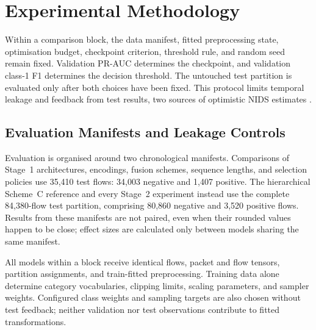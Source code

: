 \documentclass[11pt,fleqn]{report}
\begin{document}
\providecommand{\ExpPlatform}{Google Colaboratory Pro+}
\providecommand{\ExpComputeBudget}{600 purchased compute units}
\providecommand{\ExpGPU}{NVIDIA L4 (24~GB)}
\providecommand{\ExpCPU}{Google Colab hosted CPU; exact model not retained in the run metadata}
\providecommand{\ExpOS}{Google Colab hosted Linux runtime}
\providecommand{\ExpSoftware}{PyTorch and scikit-learn on CUDA; exact version snapshot not retained}
\providecommand{\ExpSuricata}{Suricata with the custom output module; exact version and revision not retained}

\chapter{Experimental Methodology}
\label{sec:experimental_methodology}

Within a comparison block, the data manifest, fitted preprocessing state, optimisation budget, checkpoint criterion, threshold rule, and random seed remain fixed. Validation PR-AUC determines the checkpoint, and validation class-1 F1 determines the decision threshold. The untouched test partition is evaluated only after both choices have been fixed. This protocol limits temporal leakage and feedback from test results, two sources of optimistic NIDS estimates \cite{SommerPaxson2010,Arp2022DosDonts}.

\section{Evaluation Manifests and Leakage Controls}
\label{subsec:experimental_data_protocol}

Evaluation is organised around two chronological manifests. Comparisons of Stage~1 architectures, encodings, fusion schemes, sequence lengths, and selection policies use 35,410 test flows: 34,003 negative and 1,407 positive. The hierarchical Scheme~C reference and every Stage~2 experiment instead use the complete 84,380-flow test partition, comprising 80,860 negative and 3,520 positive flows. Results from these manifests are not paired, even when their rounded values happen to be close; effect sizes are calculated only between models sharing the same manifest.

All models within a block receive identical flows, packet and flow tensors, partition assignments, and train-fitted preprocessing. Training data alone determine category vocabularies, clipping limits, scaling parameters, and sampler weights. Configured class weights and sampling targets are also chosen without test feedback; neither validation nor test observations contribute to fitted transformations.
\end{document}
